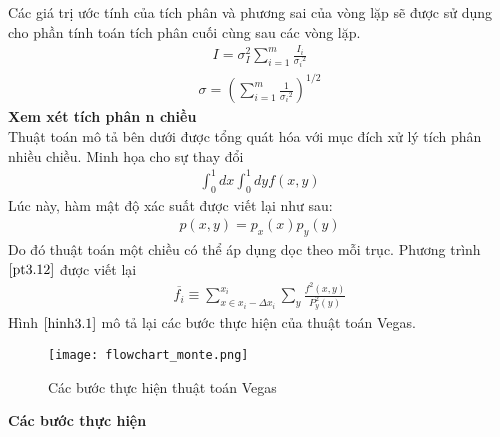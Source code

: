 Các giá trị ước tính của tích phân và phương sai của vòng lặp sẽ được sử dụng cho phần tính toán tích phân cuối cùng sau các vòng lặp. 
\begin{align}
      I=\sigma_I^2\sum_{i=1}^{m}{\frac{I_i}{{\sigma_i}^2}}
\end{align}
\begin{align}
      \sigma=\left(\sum_{i=1}^{m}{\frac{1}{{\sigma_i}^2}}\right)^{1/2}
\end{align}
\textbf{Xem xét tích phân n chiều}\\
Thuật toán mô tả bên dưới được tổng quát hóa với mục đích xử lý tích phân nhiều chiều. Minh họa cho sự thay đổi 
\begin{align}
      \int_{0}^{1}{dx} \int_{0}^{1}{dyf(x,y)} 
\end{align}
Lúc này, hàm mật độ xác suất được viết lại như sau: 
\begin{align}
      p(x,y)=p_x(x)p_y(y)
\end{align}
Do đó thuật toán một chiều có thể áp dụng dọc theo mỗi trục. Phương trình $ \ref{pt3.12} $ được viết lại
\begin{align}
      \overline{f_i} \equiv {\sum_{x\in{x_i-\Delta}x_i}^{x_i}}{\sum_y{\frac{f^2(x,y)}{P_y^2(y)}}}
\end{align}
\newline
\newline
\newline
Hình $ \ref{hinh3.1} $ mô tả lại các bước thực hiện của thuật toán Vegas.
\begin{figure}[H]
      \centering
      \texttt{[image: flowchart\_monte.png]}
      \caption{Các bước thực hiện thuật toán Vegas}\label{hinh3.1}
\end{figure}
\textbf{Các bước thực hiện }

